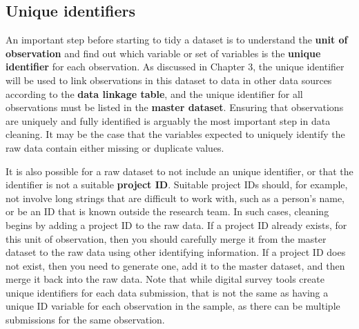 \subsection{Unique identifiers}

An important step before starting to tidy a dataset is
to understand the \textbf{unit of observation}
and find out which variable or set of variables is the \textbf{unique identifier}
for each observation.
As discussed in Chapter 3,
the unique identifier will be used to link observations in this dataset
to data in other data sources according to the \textbf{data linkage table},
and the unique identifier for all observations 
must be listed in the \textbf{master dataset}.
Ensuring that observations are uniquely and fully identified
is arguably the most important step in data cleaning.
It may be the case that the variables expected to uniquely identify
the raw data contain either missing or duplicate values.

It is also possible for a raw dataset to not include an unique identifier,
or that the identifier is not a suitable \textbf{project ID}.
Suitable project IDs should, for example, not involve long strings
that are difficult to work with, such as a person's name,
or be an ID that is known outside the research team.
In such cases, cleaning begins by 
adding a project ID to the raw data.
If a project ID already exists, 
for this unit of observation,
then you should carefully merge it 
from the master dataset
to the raw data 
using other identifying information.
If a project ID does not exist, 
then you need to generate one,
add it to the master dataset, 
and then merge it back into the raw data.
Note that while digital survey tools create 
unique identifiers for each data submission,
that is not the same as having a unique ID variable 
for each observation in the sample,
as there can be multiple submissions 
for the same observation.

